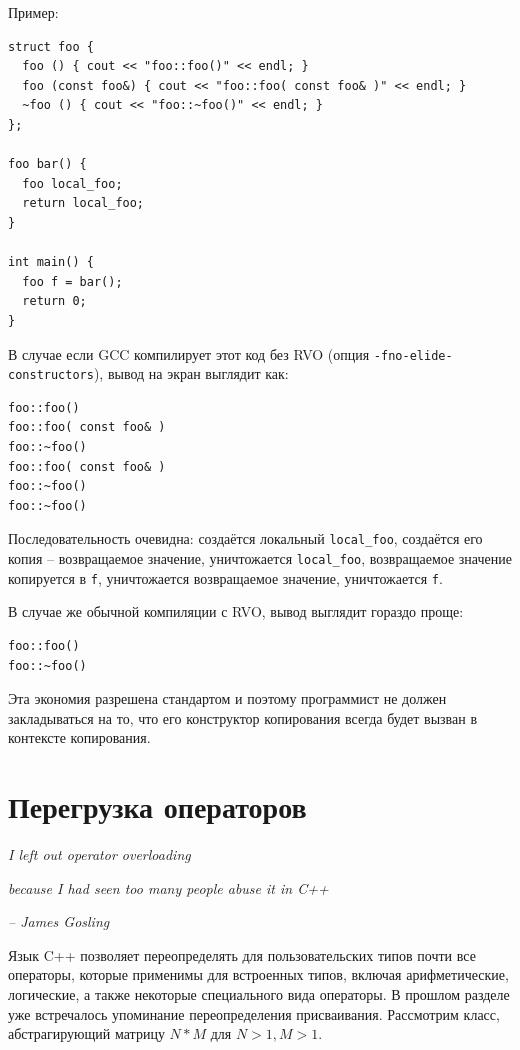 \documentclass[a4paper,12pt,oneside]{book}
\begin{document}
Пример:

\begin{lstlisting}
struct foo {
  foo () { cout << "foo::foo()" << endl; }
  foo (const foo&) { cout << "foo::foo( const foo& )" << endl; }
  ~foo () { cout << "foo::~foo()" << endl; }
};

foo bar() {
  foo local_foo;
  return local_foo;
}

int main() {
  foo f = bar();
  return 0;
}
\end{lstlisting}

В случае если GCC компилирует этот код без RVO (опция \lstinline!-fno-elide-constructors!), вывод на экран выглядит как:

\begin{lstlisting}
foo::foo()
foo::foo( const foo& )
foo::~foo()
foo::foo( const foo& )
foo::~foo()
foo::~foo()
\end{lstlisting}

Последовательность очевидна: создаётся локальный \lstinline!local_foo!, создаётся его копия -- возвращаемое значение, уничтожается \lstinline!local_foo!, возвращаемое значение копируется в \lstinline!f!, уничтожается возвращаемое значение, уничтожается \lstinline!f!.

В случае же обычной компиляции с RVO, вывод выглядит гораздо проще:

\begin{lstlisting}
foo::foo()
foo::~foo()
\end{lstlisting}

Эта экономия разрешена стандартом и поэтому программист не должен закладываться на то, что его конструктор копирования всегда будет вызван в контексте копирования.

\pagebreak
\section{Перегрузка операторов}\label{OperatorOverloading}

\hfill\textit{I left out operator overloading}

\hfill\textit{because I had seen too many people abuse it in C++}{\vspace{0.5em}}

\hfill\textit{-- James Gosling}

Язык C++ позволяет переопределять для пользовательских типов почти все операторы, которые применимы для встроенных типов, включая арифметические, логические, а также некоторые специального вида операторы. В прошлом разделе уже встречалось упоминание переопределения присваивания. Рассмотрим класс, абстрагирующий матрицу $N*M$ для $N>1, M>1$.
\end{document}
